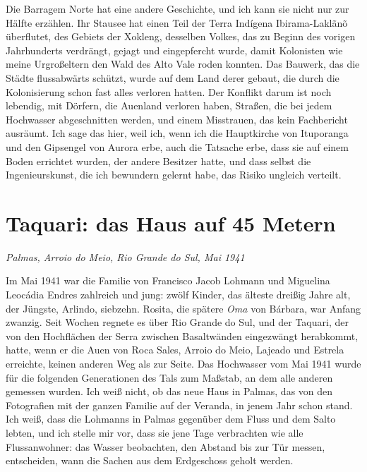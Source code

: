 \documentclass[
  ngerman,
  11pt,
  openany]{book}
\begin{document}
Die Barragem Norte hat eine andere Geschichte, und ich kann sie nicht
nur zur Hälfte erzählen. Ihr Stausee hat einen Teil der Terra Indígena
Ibirama-Laklãnõ überflutet, des Gebiets der Xokleng, desselben Volkes,
das zu Beginn des vorigen Jahrhunderts verdrängt, gejagt und
eingepfercht wurde, damit Kolonisten wie meine Urgroßeltern den Wald des
Alto Vale roden konnten. Das Bauwerk, das die Städte flussabwärts
schützt, wurde auf dem Land derer gebaut, die durch die Kolonisierung
schon fast alles verloren hatten. Der Konflikt darum ist noch lebendig,
mit Dörfern, die Auenland verloren haben, Straßen, die bei jedem
Hochwasser abgeschnitten werden, und einem Misstrauen, das kein
Fachbericht ausräumt. Ich sage das hier, weil ich, wenn ich die
Hauptkirche von Ituporanga und den Gipsengel von Aurora erbe, auch die
Tatsache erbe, dass sie auf einem Boden errichtet wurden, der andere
Besitzer hatte, und dass selbst die Ingenieurskunst, die ich bewundern
gelernt habe, das Risiko ungleich verteilt.

\section{Taquari: das Haus auf 45
Metern}\label{taquari-das-haus-auf-45-metern}

\emph{Palmas, Arroio do Meio, Rio Grande do Sul, Mai 1941}

Im Mai 1941 war die Familie von Francisco Jacob Lohmann und Miguelina
Leocádia Endres zahlreich und jung: zwölf Kinder, das älteste dreißig
Jahre alt, der Jüngste, Arlindo, siebzehn. Rosita, die spätere
\emph{Oma} von Bárbara, war Anfang zwanzig. Seit Wochen regnete es über
Rio Grande do Sul, und der Taquari, der von den Hochflächen der Serra
zwischen Basaltwänden eingezwängt herabkommt, hatte, wenn er die Auen
von Roca Sales, Arroio do Meio, Lajeado und Estrela erreichte, keinen
anderen Weg als zur Seite. Das Hochwasser vom Mai 1941 wurde für die
folgenden Generationen des Tals zum Maßstab, an dem alle anderen
gemessen wurden. Ich weiß nicht, ob das neue Haus in Palmas, das von den
Fotografien mit der ganzen Familie auf der Veranda, in jenem Jahr schon
stand. Ich weiß, dass die Lohmanns in Palmas gegenüber dem Fluss und dem
Salto lebten, und ich stelle mir vor, dass sie jene Tage verbrachten wie
alle Flussanwohner: das Wasser beobachten, den Abstand bis zur Tür
messen, entscheiden, wann die Sachen aus dem Erdgeschoss geholt werden.
\end{document}

